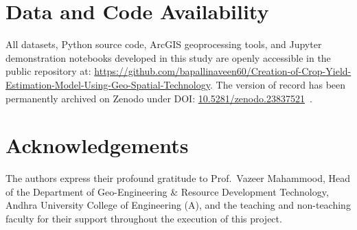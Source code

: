\documentclass[11pt,a4paper]{article}
\begin{document}
\section*{Data and Code Availability}
All datasets, Python source code, ArcGIS geoprocessing tools, and Jupyter demonstration notebooks developed in this study are openly accessible in the public repository at:
\url{https://github.com/bapallinaveen60/Creation-of-Crop-Yield-Estimation-Model-Using-Geo-Spatial-Technology}.
The version of record has been permanently archived on Zenodo under DOI:
\href{https://doi.org/10.5281/zenodo.23837521}{10.5281/zenodo.23837521}~\cite{naveen2023zenodo}.

\section*{Acknowledgements}
The authors express their profound gratitude to Prof.~Vazeer Mahammood, Head of the Department of Geo-Engineering \& Resource Development Technology, Andhra University College of Engineering (A), and the teaching and non-teaching faculty for their support throughout the execution of this project.



\end{document}
